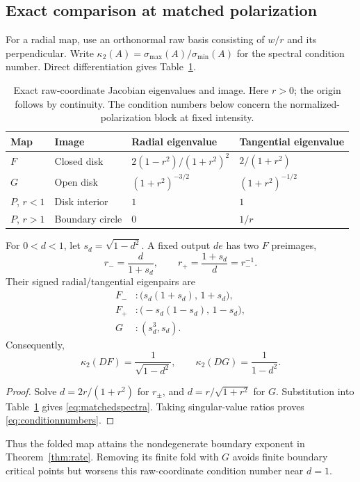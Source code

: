 \subsection{Exact comparison at matched polarization}
For a radial map, use an orthonormal raw basis consisting of $w/r$ and its perpendicular. Write $\kappa_2(A)=\sigma_{\max}(A)/\sigma_{\min}(A)$ for the spectral condition number. Direct differentiation gives Table~\ref{tab:spectra}.
\begin{table}[!t]
\caption{Exact raw-coordinate Jacobian eigenvalues and image. Here $r>0$; the origin follows by continuity. The condition numbers below concern the normalized-polarization block at fixed intensity.}
\label{tab:spectra}
\centering\small\renewcommand{\arraystretch}{1.15}
\begin{tabular}{@{}llll@{}}\toprule
Map & Image & Radial eigenvalue & Tangential eigenvalue\\\midrule
$F$ & Closed disk & $2(1-r^2)/(1+r^2)^2$ & $2/(1+r^2)$\\
$G$ & Open disk & $(1+r^2)^{-3/2}$ & $(1+r^2)^{-1/2}$\\
$P$, $r<1$ & Disk interior & $1$ & $1$\\
$P$, $r>1$ & Boundary circle & $0$ & $1/r$\\\bottomrule
\end{tabular}
\end{table}

\begin{proposition}
\label{prop:spectra}
For $0<d<1$, let $s_d=\sqrt{1-d^2}$. A fixed output $de$ has two $F$ preimages,
\begin{equation}
 r_-=\frac{d}{1+s_d},\qquad r_+=\frac{1+s_d}{d}=r_-^{-1}.
 \label{eq:inverse}
\end{equation}
Their signed radial/tangential eigenpairs are
\begin{equation}
 \begin{aligned}
 F_- &: \bigl(s_d(1+s_d),\,1+s_d\bigr),\\
 F_+ &: \bigl(-s_d(1-s_d),\,1-s_d\bigr),\\
 G &: (s_d^3,s_d).
 \end{aligned}
 \label{eq:matchedspectra}
\end{equation}
Consequently,
\begin{equation}
 \kappa_2(DF)=\frac1{\sqrt{1-d^2}},\qquad
 \kappa_2(DG)=\frac1{1-d^2}.
 \label{eq:conditionnumbers}
\end{equation}
\end{proposition}
\begin{proof}
Solve $d=2r/(1+r^2)$ for $r_\pm$, and $d=r/\sqrt{1+r^2}$ for $G$. Substitution into Table~\ref{tab:spectra} gives \eqref{eq:matchedspectra}. Taking singular-value ratios proves \eqref{eq:conditionnumbers}.
\end{proof}
Thus the folded map attains the nondegenerate boundary exponent in Theorem~\ref{thm:rate}. Removing its finite fold with $G$ avoids finite boundary critical points but worsens this raw-coordinate condition number near $d=1$.

